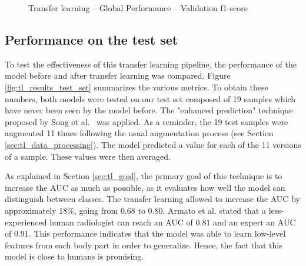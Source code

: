 \begin{figure}[!h]
\centering
\noindent
{}
\caption{Transfer learning -- Global Performance -- Validation f1-score}
\label{fig:tl_global_validation_f1score}
\end{figure}


\subsection{Performance on the test set}
\setlength{\marginparwidth}{3cm}\leavevmode {}To test the effectiveness of this transfer learning pipeline, the performance of the model before and after transfer learning was compared. Figure \ref{fig:tl_results_test_set} summarizes the various metrics. To obtain these numbers, both models were tested on our test set composed of 19 samples which have never been seen by the model before. The "enhanced prediction" technique proposed by Song et al.~\cite{07} was applied. As a reminder, the 19 test samples were augmented 11 times following the usual augmentation process (see Section \ref{sec:tl_data_processing}). The model predicted a value for each of the 11 versions of a sample. These values were then averaged. 

As explained in Section \ref{sec:tl_goal}, the primary goal of this technique is to increase the AUC as much as possible, as it evaluates how well the model can distinguish between classes. The transfer learning allowed to increase the AUC by approximately 18\%, going from $0.68$ to $0.80$. Armato et al. \cite{42} stated that a less-experienced human radiologist can reach an AUC of $0.81$ and an expert an AUC of $0.91$. This performance indicates that the model was able to learn low-level features from each body part in order to generalize. Hence, the fact that this model is close to humans is promising. 

